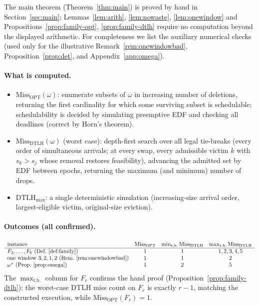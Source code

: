\documentclass{amsart}
\theoremstyle{definition}
\begin{document}
The main theorem (Theorem~\ref{thm:main}) is proved by hand in
Section~\ref{sec:main}; Lemmas~\ref{lem:arith}, \ref{lem:nowaste},
\ref{lem:onewindow} and Propositions~\ref{prop:family-opt},
\ref{prop:family-dtlh} require no computation beyond the displayed arithmetic.
For completeness we list the auxiliary numerical checks (used only for the
illustrative Remark~\ref{rem:onewindowbad}, Proposition~\ref{prop:det}, and
Appendix~\ref{app:omega}).

\paragraph{What is computed.}
\begin{itemize}
\item $\mathrm{Miss}_{\mathrm{OPT}}(\omega)$: enumerate subsets of $\omega$ in
increasing number of deletions, returning the first cardinality for which some
surviving subset is schedulable; schedulability is decided by simulating
preemptive EDF and checking all deadlines (correct by Horn's theorem).
\item $\mathrm{Miss}_{\mathrm{DTLH}}(\omega)$ (worst case): depth-first search
over all legal tie-breaks (every order of simultaneous arrivals; at every swap,
every admissible victim $k$ with $s_k>s_j$ whose removal restores feasibility),
advancing the admitted set by EDF between epochs, returning the maximum (and
minimum) number of drops.
\item $\mathrm{DTLH}_{\max}$: a single deterministic simulation (increasing-size
arrival order, largest-eligible victim, original-size eviction).
\end{itemize}

\paragraph{Outcomes (all confirmed).}
\[
\begin{array}{lccc}
\text{instance} & \mathrm{Miss}_{\mathrm{OPT}} & \min_{\text{t.b.}}\mathrm{Miss}_{\mathrm{DTLH}} & \max_{\text{t.b.}}\mathrm{Miss}_{\mathrm{DTLH}}\\\hline
F_2,\dots,F_6\ (\text{Def.~\ref{def:family}}) & 1 & 1 & 1,2,3,4,5\\
\text{one window }3,2,1,2\ (\text{Rem.~\ref{rem:onewindowbad}}) & 1 & 1 & 2\\
\omega^\star\ (\text{Prop.~\ref{prop:omega}}) & 1 & 2 & 5
\end{array}
\]
The $\max_{\text{t.b.}}$ column for $F_r$ confirms the hand proof
(Proposition~\ref{prop:family-dtlh}): the worst-case DTLH miss count on $F_r$ is
exactly $r-1$, matching the constructed execution, while
$\mathrm{Miss}_{\mathrm{OPT}}(F_r)=1$.
\end{document}
